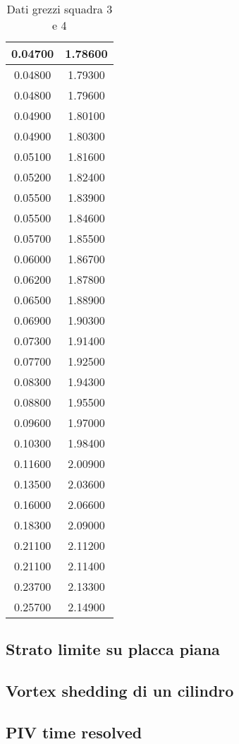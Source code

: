 \begin{table}[H]
\begin{tabular}{|c|c|}
    0.04700         & 1.78600      \\ \hline
    0.04800         & 1.79300      \\ \hline
    0.04800         & 1.79600      \\ \hline
    0.04900         & 1.80100      \\ \hline
    0.04900         & 1.80300      \\ \hline
    0.05100         & 1.81600      \\ \hline
    0.05200         & 1.82400      \\ \hline
    0.05500         & 1.83900      \\ \hline
    0.05500         & 1.84600      \\ \hline
    0.05700         & 1.85500      \\ \hline
    0.06000         & 1.86700      \\ \hline
    0.06200         & 1.87800      \\ \hline
    0.06500         & 1.88900      \\ \hline
    0.06900         & 1.90300      \\ \hline
    0.07300         & 1.91400      \\ \hline
    0.07700         & 1.92500      \\ \hline
    0.08300         & 1.94300      \\ \hline
    0.08800         & 1.95500      \\ \hline
    0.09600         & 1.97000      \\ \hline
    0.10300         & 1.98400      \\ \hline
    0.11600         & 2.00900      \\ \hline
    0.13500         & 2.03600      \\ \hline
    0.16000         & 2.06600      \\ \hline
    0.18300         & 2.09000      \\ \hline
    0.21100         & 2.11200      \\ \hline
    0.21100         & 2.11400      \\ \hline
    0.23700         & 2.13300      \\ \hline
    0.25700         & 2.14900      \\ \hline
    \end{tabular}
    \caption{Dati grezzi squadra 3 e 4}
\end{table}

\subsection{Strato limite su placca piana}\label{a9}

\subsection{Vortex shedding di un cilindro}\label{a10}

\subsection{PIV time resolved}\label{a11}

